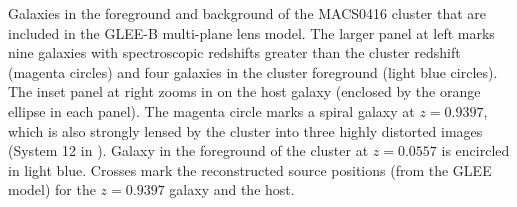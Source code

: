\label{fig:LineOfSightLenses}
Galaxies in the foreground and background of the MACS0416 cluster that
are included in the GLEE-B multi-plane lens model. The larger panel at
left marks nine galaxies with spectroscopic redshifts greater than the
cluster redshift (magenta circles) and four galaxies in the cluster
foreground (light blue circles).  The inset panel at right zooms in on
the \spock host galaxy (enclosed by the orange ellipse in each panel).
The magenta circle marks a spiral galaxy at $z=0.9397$, which is also
strongly lensed by the  cluster into three highly distorted
images (System 12 in \citet{Caminha:2017}).  Galaxy in the foreground
of the cluster at $z=0.0557$ is encircled in light blue.  Crosses mark
the reconstructed source positions (from the GLEE model) for the
$z=0.9397$ galaxy and the \spock host.
